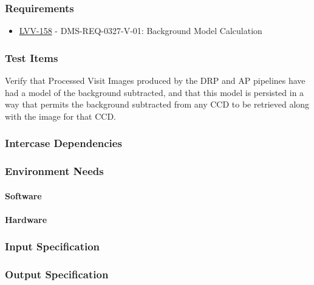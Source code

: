 \subsubsection{Requirements}
\begin{itemize}
\item \href{https://jira.lsstcorp.org/browse/LVV-158}{LVV-158} - DMS-REQ-0327-V-01: Background Model Calculation
\end{itemize}

\subsubsection{Test Items}
Verify that Processed Visit Images produced by the DRP and AP pipelines
have had a model of the background subtracted, and that this model is
persisted in a way that permits the background subtracted from any CCD
to be retrieved along with the image for that CCD.



\subsubsection{Intercase Dependencies}

\subsubsection{Environment Needs}

\paragraph{Software}

\paragraph{Hardware}

\subsubsection{Input Specification}

\subsubsection{Output Specification}

